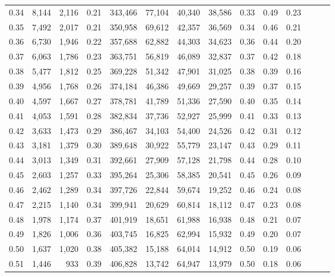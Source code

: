 \begin{tabular}{rrrrrrrrrrrrrr}
0.34 &   8,144 &  2,116 &  0.21 &  343,466 &   77,104 &  40,340 &  38,586 &  0.33 &  0.49 &      0.23 \\
0.35 &   7,492 &  2,017 &  0.21 &  350,958 &   69,612 &  42,357 &  36,569 &  0.34 &  0.46 &      0.21 \\
0.36 &   6,730 &  1,946 &  0.22 &  357,688 &   62,882 &  44,303 &  34,623 &  0.36 &  0.44 &      0.20 \\
0.37 &   6,063 &  1,786 &  0.23 &  363,751 &   56,819 &  46,089 &  32,837 &  0.37 &  0.42 &      0.18 \\
0.38 &   5,477 &  1,812 &  0.25 &  369,228 &   51,342 &  47,901 &  31,025 &  0.38 &  0.39 &      0.16 \\
0.39 &   4,956 &  1,768 &  0.26 &  374,184 &   46,386 &  49,669 &  29,257 &  0.39 &  0.37 &      0.15 \\
0.40 &   4,597 &  1,667 &  0.27 &  378,781 &   41,789 &  51,336 &  27,590 &  0.40 &  0.35 &      0.14 \\
0.41 &   4,053 &  1,591 &  0.28 &  382,834 &   37,736 &  52,927 &  25,999 &  0.41 &  0.33 &      0.13 \\
0.42 &   3,633 &  1,473 &  0.29 &  386,467 &   34,103 &  54,400 &  24,526 &  0.42 &  0.31 &      0.12 \\
0.43 &   3,181 &  1,379 &  0.30 &  389,648 &   30,922 &  55,779 &  23,147 &  0.43 &  0.29 &      0.11 \\
0.44 &   3,013 &  1,349 &  0.31 &  392,661 &   27,909 &  57,128 &  21,798 &  0.44 &  0.28 &      0.10 \\
0.45 &   2,603 &  1,257 &  0.33 &  395,264 &   25,306 &  58,385 &  20,541 &  0.45 &  0.26 &      0.09 \\
0.46 &   2,462 &  1,289 &  0.34 &  397,726 &   22,844 &  59,674 &  19,252 &  0.46 &  0.24 &      0.08 \\
0.47 &   2,215 &  1,140 &  0.34 &  399,941 &   20,629 &  60,814 &  18,112 &  0.47 &  0.23 &      0.08 \\
0.48 &   1,978 &  1,174 &  0.37 &  401,919 &   18,651 &  61,988 &  16,938 &  0.48 &  0.21 &      0.07 \\
0.49 &   1,826 &  1,006 &  0.36 &  403,745 &   16,825 &  62,994 &  15,932 &  0.49 &  0.20 &      0.07 \\
0.50 &   1,637 &  1,020 &  0.38 &  405,382 &   15,188 &  64,014 &  14,912 &  0.50 &  0.19 &      0.06 \\
0.51 &   1,446 &    933 &  0.39 &  406,828 &   13,742 &  64,947 &  13,979 &  0.50 &  0.18 &      0.06 \\

\end{tabular}
